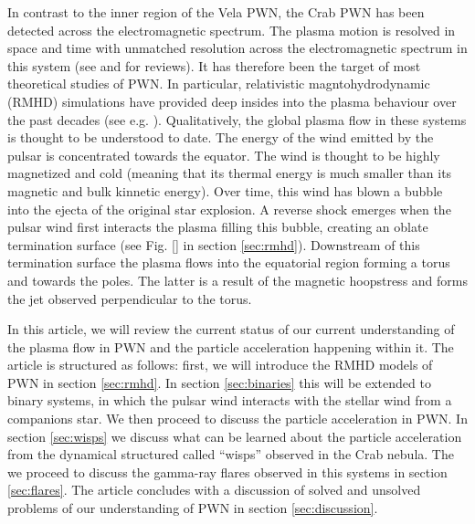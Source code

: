In contrast to the inner region of the Vela PWN, the Crab PWN has been detected across the electromagnetic spectrum. The plasma motion is resolved in space and time with unmatched resolution across the electromagnetic spectrum in this system (see \citet{Hester_2008} and \citet{BuehlerBlandford2013a} for reviews). It has therefore been the target of most theoretical studies of PWN. In particular, relativistic magntohydrodynamic (RMHD) simulations have provided deep insides into the plasma behaviour over the past decades (see e.g.  \citet{Komissarov_2004,Del_Zanna_2006,Porth_2013}). Qualitatively, the global plasma flow in these systems is thought to be understood to date. The energy of the wind emitted by the pulsar is concentrated towards the equator. The wind is thought to be highly magnetized and cold (meaning that its thermal energy is much smaller than its magnetic and bulk kinnetic energy). Over time, this wind has blown a bubble into the ejecta of the original star explosion. A reverse shock emerges when the pulsar wind first interacts the plasma filling this bubble, creating an oblate termination surface (see Fig. \ref{} in section \ref{sec:rmhd}). Downstream of this termination surface the plasma flows into the equatorial region forming a torus and towards the poles. The latter is a result of the magnetic hoopstress and forms the jet observed perpendicular to the torus.

In this article, we will review the current status of our current understanding of the plasma flow in PWN and the particle acceleration happening within it.  The article is structured as follows: first, we will introduce the RMHD models of PWN in section \ref{sec:rmhd}. In section \ref{sec:binaries} this will be extended to binary systems, in which the pulsar wind interacts with the stellar wind from a companions star. We then proceed to discuss the particle acceleration in PWN. In section \ref{sec:wisps} we discuss what can be learned about the particle acceleration from the dynamical structured called ``wisps'' observed in the Crab nebula. The we proceed to discuss the gamma-ray flares observed in this systems in section \ref{sec:flares}. The article concludes with a discussion of solved and unsolved problems of our understanding of PWN in section \ref{sec:discussion}.